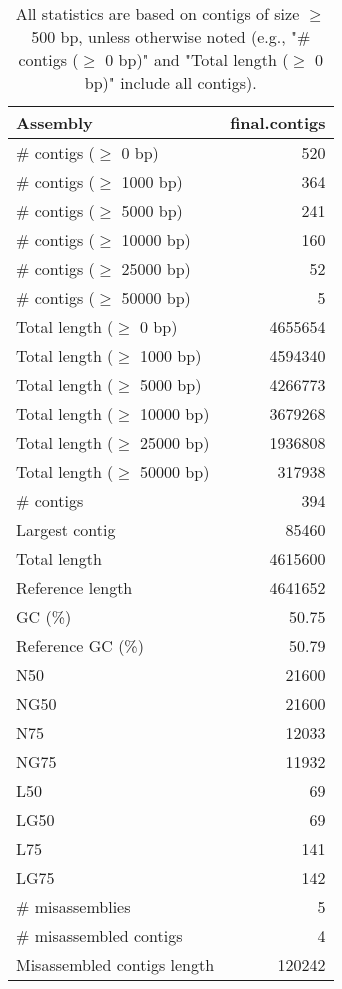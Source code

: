 \documentclass[12pt,a4paper]{article}
\begin{document}
\begin{table}[ht]
\begin{center}
\caption{All statistics are based on contigs of size $\geq$ 500 bp, unless otherwise noted (e.g., "\# contigs ($\geq$ 0 bp)" and "Total length ($\geq$ 0 bp)" include all contigs).}
\begin{tabular}{|l*{1}{|r}|}
\hline
Assembly & final.contigs \\ \hline
\# contigs ($\geq$ 0 bp) & 520 \\ \hline
\# contigs ($\geq$ 1000 bp) & 364 \\ \hline
\# contigs ($\geq$ 5000 bp) & 241 \\ \hline
\# contigs ($\geq$ 10000 bp) & 160 \\ \hline
\# contigs ($\geq$ 25000 bp) & 52 \\ \hline
\# contigs ($\geq$ 50000 bp) & 5 \\ \hline
Total length ($\geq$ 0 bp) & 4655654 \\ \hline
Total length ($\geq$ 1000 bp) & 4594340 \\ \hline
Total length ($\geq$ 5000 bp) & 4266773 \\ \hline
Total length ($\geq$ 10000 bp) & 3679268 \\ \hline
Total length ($\geq$ 25000 bp) & 1936808 \\ \hline
Total length ($\geq$ 50000 bp) & 317938 \\ \hline
\# contigs & 394 \\ \hline
Largest contig & 85460 \\ \hline
Total length & 4615600 \\ \hline
Reference length & 4641652 \\ \hline
GC (\%) & 50.75 \\ \hline
Reference GC (\%) & 50.79 \\ \hline
N50 & 21600 \\ \hline
NG50 & 21600 \\ \hline
N75 & 12033 \\ \hline
NG75 & 11932 \\ \hline
L50 & 69 \\ \hline
LG50 & 69 \\ \hline
L75 & 141 \\ \hline
LG75 & 142 \\ \hline
\# misassemblies & 5 \\ \hline
\# misassembled contigs & 4 \\ \hline
Misassembled contigs length & 120242 \\ \hline

\end{tabular}
\end{center}
\end{table}
\end{document}
